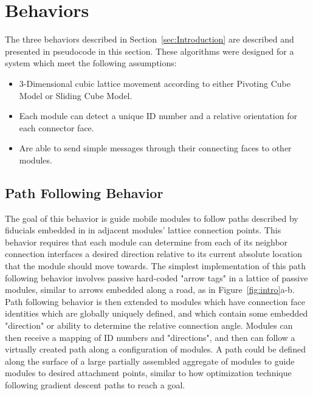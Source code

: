 \section{Behaviors}
\label{sec:Behaviors}

The three behaviors described in Section~\ref{sec:Introduction} are described and presented in pseudocode in this section. These algorithms were designed for a system which meet the following assumptions:
\begin{itemize}
	\item 3-Dimensional cubic lattice movement according to either Pivoting Cube Model or Sliding Cube Model.
	\item Each module can detect a unique ID number and a relative orientation for each connector face.
	\item Are able to send simple messages through their connecting faces to other modules.
\end{itemize}

\subsection{Path Following Behavior}
\label{sec:algArrow}

The goal of this behavior is guide mobile modules to follow paths described by fiducials embedded in in adjacent modules' lattice connection points. This behavior requires that  each module can determine from each of its neighbor connection interfaces a desired direction relative to its current absolute location that the module should move towards. The simplest implementation of this path following behavior involves passive hard-coded "arrow tags" in a lattice of passive modules, similar to arrows embedded along a road, as in Figure~\ref{fig:intro}a-b. Path following behavior is then extended to modules which have connection face identities which are globally uniquely defined, and which contain some embedded "direction" or ability to determine the relative connection angle. Modules can then receive a mapping of ID numbers and "directions", and then can follow a virtually created path along a configuration of modules. A path could be defined along the surface of a large partially assembled aggregate of modules to guide modules to desired attachment points, similar to how optimization technique following gradient descent paths to reach a goal.


